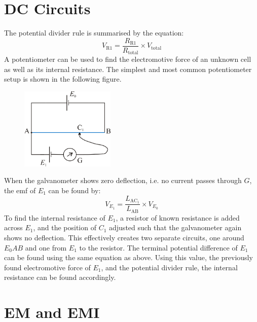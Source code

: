 \documentclass[a4paper,11pt]{article}
\begin{document}
	\section{DC Circuits}
	The potential divider rule is summarised by the equation: 
	\begin{equation*}
	V_{\text{R1}} = \frac{R_{\text{R1}}}{R_{\text{total}}} \times V_{\text{total}}
	\end{equation*}
	A potentiometer can be used to find the electromotive force of an unknown cell as well as its internal resistance. The simplest and most common potentiometer setup is shown in the following figure.
	\begin{figure}[H]
		\centering \includegraphics[width=0.4\textwidth]{potentiometer}
	\end{figure}
	When the galvanometer shows zero deflection, i.e. no current passes through $G$, the emf of $E_1$ can be found by:
	\begin{equation*}
	V_{E_1} = \frac{L_{\text{AC$_1$}}}{L_{\text{AB}}} \times V_{E_0}
	\end{equation*}
	To find the internal resistance of $E_1$, a resistor of known resistance is added across $E_1$, and the position of $C_1$ adjusted such that the galvanometer again shows no deflection. This effectively creates two separate circuits, one around $E_0AB$ and one from $E_1$ to the resistor. The terminal potential difference of $E_1$ can be found using the same equation as above. Using this value, the previously found electromotive force of $E_1$, and the potential divider rule, the internal resistance can be found accordingly. 
	
	\newpage
	\section{EM and EMI}
\end{document}
